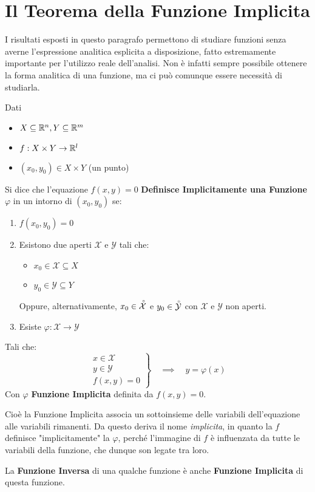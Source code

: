 \section{Il Teorema della Funzione Implicita}
I risultati esposti in questo paragrafo permettono di studiare funzioni senza averne l'espressione analitica esplicita a disposizione, fatto estremamente importante per l'utilizzo reale dell'analisi. Non è infatti sempre possibile ottenere la forma analitica di una funzione, ma ci può comunque essere necessità di studiarla.
\begin{definition}
	\label{def:funz_impl}
	Dati
	\begin{itemize}[noitemsep]
		\item $X \subseteq \mathbb{R}^n, Y \subseteq \mathbb{R}^m$
		\item $f: X \times Y \to \mathbb{R}^l$
		\item $(x_0, y_0) \in X \times Y$ (un punto)
	\end{itemize}
	Si dice che l'equazione $f(x,y) = 0$ \textbf{Definisce Implicitamente una Funzione} $\varphi$ in un intorno di $(x_0,y_0)$ se:
	\begin{enumerate}
		\item $f(x_0,y_0) = 0$
		\item Esistono due aperti $\mathcal{X}$ e $\mathcal{Y}$ tali che:
			\begin{itemize}[noitemsep, topsep=0pt]
				\item $x_0 \in \mathcal{X} \subseteq X$
				\item $y_0 \in \mathcal{Y} \subseteq Y$
			\end{itemize}
			\begin{note}
				Oppure, alternativamente, $x_0 \in \accentset{\circ}{\mathcal{X}}$ e $y_0 \in \accentset{\circ}{\mathcal{Y}}$ con $\mathcal{X}$ e $\mathcal{Y}$ non aperti.
			\end{note}\vspace*{-2ex}
		\item Esiste $\varphi: \mathcal{X} \to \mathcal{Y}$
	\end{enumerate}
	Tali che:
	\[
		\left.
		\begin{array}{l}
			x \in \mathcal{X}\\
			y \in \mathcal{Y}\\
			f(x,y) = 0
		\end{array}
		\right\}
		\quad \implies \quad
		y = \varphi(x)
	\]
	Con $\varphi$ \textbf{Funzione Implicita} definita da $f(x,y)=0$.

	\vspace*{\baselineskip}
	Cioè la Funzione Implicita associa un sottoinsieme delle variabili dell'equazione alle variabili rimanenti. Da questo deriva il nome \textit{implicita}, in quanto la $f$ definisce "implicitamente" la $\varphi$, perché l'immagine di $f$ è influenzata da tutte le variabili della funzione, che dunque son legate tra loro.
	\begin{note}
		La \textbf{Funzione Inversa} di una qualche funzione è anche \textbf{Funzione Implicita} di questa funzione.
	\end{note}
\end{definition}
